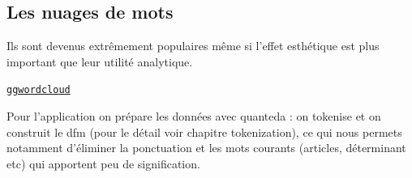 \documentclass[
  letterpaper,
  DIV=11,
  numbers=noendperiod]{scrreprt}
\begin{document}
\subsection{Les nuages de mots}\label{les-nuages-de-mots}

Ils sont devenus extrêmement populaires même si l'effet esthétique est
plus important que leur utilité analytique.

\href{https://cran.r-project.org/web/packages/ggwordcloud/vignettes/ggwordcloud.html}{\texttt{ggwordcloud}}

Pour l'application on prépare les données avec quanteda : on tokenise et
on construit le dfm (pour le détail voir chapitre tokenization), ce qui
nous permets notamment d'éliminer la ponctuation et les mots courants
(articles, déterminant etc) qui apportent peu de signification.
\end{document}
